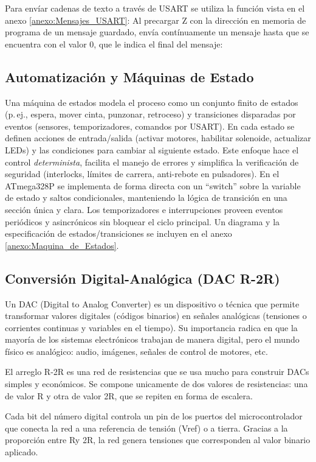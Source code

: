 Para envíar cadenas de texto a través de USART se utiliza la función vista en el anexo \ref{anexo:Mensajes_USART}: Al precargar Z con la dirección en memoria de programa de un mensaje guardado, envía contínuamente un mensaje hasta que se encuentra con el valor 0, que le indica el final del mensaje:

\subsection{Automatización y Máquinas de Estado}
Una máquina de estados modela el proceso como un conjunto finito de estados (p.\,ej., espera, mover cinta, punzonar, retroceso) y transiciones disparadas por eventos (sensores, temporizadores, comandos por USART). En cada estado se definen acciones de entrada/salida (activar motores, habilitar solenoide, actualizar LEDs) y las condiciones para cambiar al siguiente estado. Este enfoque hace el control \textit{determinista}, facilita el manejo de errores y simplifica la verificación de seguridad (interlocks, límites de carrera, anti-rebote en pulsadores). En el ATmega328P se implementa de forma directa con un “switch” sobre la variable de estado y saltos condicionales, manteniendo la lógica de transición en una sección única y clara. Los temporizadores e interrupciones proveen eventos periódicos y asincrónicos sin bloquear el ciclo principal. Un diagrama y la especificación de estados/transiciones se incluyen en el anexo \ref{anexo:Maquina_de_Estados}.


\subsection{Conversión Digital-Analógica (DAC R-2R)}
Un DAC (Digital to Analog Converter) es un dispositivo o técnica que permite transformar valores digitales (códigos binarios) en señales analógicas (tensiones o corrientes continuas y variables en el tiempo). Su importancia radica en que la mayoría de los sistemas electrónicos trabajan de manera digital, pero el mundo físico es analógico: audio, imágenes, señales de control de motores, etc.

El arreglo R-2R es una red de resistencias que se usa mucho para construir DACs simples y económicos. Se compone unicamente de dos valores de resistencias: una de valor R y otra de valor 2R, que se repiten en forma de escalera.

Cada bit del número digital controla un pin de los puertos del microcontrolador que conecta la red a una referencia de tensión (Vref) o a tierra. Gracias a la proporción entre Ry 2R, la red genera tensiones que corresponden al valor binario aplicado.

